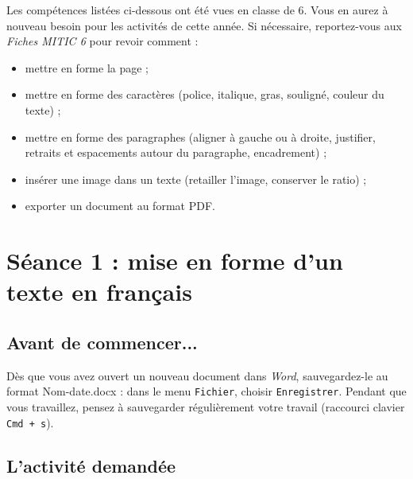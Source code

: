 \phantom{rien}


Les compétences listées ci-dessous ont été vues en classe de 6. Vous en aurez à nouveau besoin pour les activités de cette année. Si nécessaire, reportez-vous aux \emph{Fiches MITIC 6} pour revoir comment :  

\begin{itemize}
\item mettre en forme la page ;
\item mettre en forme des caractères (police, italique, gras, souligné, couleur du texte) ;
\item mettre en forme des paragraphes (aligner à gauche ou à droite, justifier, retraits et espacements autour du paragraphe, encadrement) ;
\item insérer une image dans un texte (retailler l'image, conserver le ratio) ;
\item exporter un document au format PDF.
\end{itemize}







%
%
%
%

\newpage

\section{Séance 1 : mise en forme d'un texte en français}\label{ficheTexte5e1}

\subsection{Avant de commencer...}

Dès que vous avez ouvert un nouveau document dans \emph{Word}, sauvegardez-le au format Nom-date.docx : dans le menu \texttt{Fichier}, choisir \texttt{Enregistrer}. Pendant que vous travaillez, pensez à sauvegarder régulièrement votre travail (raccourci clavier \texttt{Cmd + s}).   


\subsection{L'activité demandée}

\vspace{10pt}

